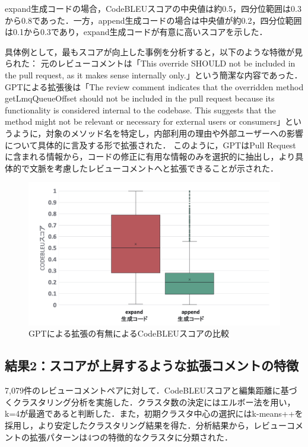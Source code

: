\documentclass[11pt]{jreport}
\begin{document}
expand生成コードの場合，CodeBLEUスコアの中央値は約0.5，四分位範囲は0.3から0.8であった．一方，append生成コードの場合は中央値が約0.2，四分位範囲は0.1から0.3であり，expand生成コードが有意に高いスコアを示した．

具体例として，最もスコアが向上した事例を分析すると，以下のような特徴が見られた：
元のレビューコメントは「This override SHOULD not be included in the pull request, as it makes sense internally only.」という簡潔な内容であった．GPTによる拡張後は「The review comment indicates that the overridden method getLmqQueueOffset should not be included in the pull request because its functionality is considered internal to the codebase. This suggests that the method might not be relevant or necessary for external users or consumers」というように，対象のメソッド名を特定し，内部利用の理由や外部ユーザーへの影響について具体的に言及する形で拡張された．
このように，GPTはPull Requestに含まれる情報から，コードの修正に有用な情報のみを選択的に抽出し，より具体的で文脈を考慮したレビューコメントへと拡張できることが示された．

\begin{figure}[htbp]
\centering
\includegraphics[width=0.9\linewidth]{@BSthesis2024_Akamatsu/Akamatsu_figs/rq2_result01.png}
\caption{GPTによる拡張の有無によるCodeBLEUスコアの比較}
\label{fig:boxplot}
\end{figure}

\subsection{結果2：スコアが上昇するような拡張コメントの特徴}
7,079件のレビューコメントペアに対して．CodeBLEUスコアと編集距離に基づくクラスタリング分析を実施した．クラスタ数の決定にはエルボー法を用い，k=4が最適であると判断した．また，初期クラスタ中心の選択にはk-means++を採用し，より安定したクラスタリング結果を得た．分析結果から，レビューコメントの拡張パターンは4つの特徴的なクラスタに分類された．
\end{document}
